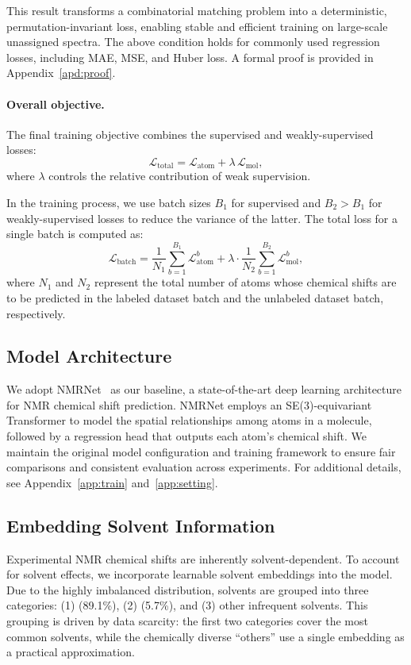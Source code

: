 This result transforms a combinatorial matching problem into a deterministic, permutation-invariant loss, enabling stable and efficient training on large-scale unassigned spectra.
The above condition holds for commonly used regression losses, including MAE, MSE, and Huber loss.
A formal proof is provided in Appendix~\ref{apd:proof}.

\paragraph{Overall objective.}
The final training objective combines the supervised and weakly-supervised losses:
\begin{equation}
\mathcal{L}_{\text{total}} = \mathcal{L}_{\text{atom}} + \lambda \, \mathcal{L}_{\text{mol}},
\label{eq:loss-total}
\end{equation}
where $\lambda$ controls the relative contribution of weak supervision.

In the training process, we use batch sizes $B_1$ for supervised and $B_2 > B_1$ for weakly-supervised losses to reduce the variance of the latter.
The total loss for a single batch is computed as:
\begin{equation}
\mathcal{L}_{\text{batch}} = \frac{1}{N_1} \sum_{b=1}^{B_1} \mathcal{L}_{\text{atom}}^b + \lambda \cdot \frac{1}{N_2} \sum_{b=1}^{B_2} \mathcal{L}_{\text{mol}}^b,
\end{equation}
where \( N_1 \) and \( N_2 \) represent the total number of atoms whose chemical shifts are to be predicted in the labeled dataset batch and the unlabeled dataset batch, respectively.


\subsection{Model Architecture}

We adopt NMRNet~\cite{xu2025toward} as our baseline, a state-of-the-art deep learning architecture for NMR chemical shift prediction. NMRNet employs an SE(3)-equivariant Transformer to model the spatial relationships among atoms in a molecule, followed by a regression head that outputs each atom's chemical shift. We maintain the original model configuration and training framework to ensure fair comparisons and consistent evaluation across experiments. For additional details, see Appendix~\ref{app:train} and~\ref{app:setting}.





\subsection{Embedding Solvent Information}
\label{subsec:solv_embed}
Experimental NMR chemical shifts are inherently solvent-dependent. To account for solvent effects, we incorporate learnable solvent embeddings into the model.
Due to the highly imbalanced distribution, solvents are grouped into three categories: (1)  (89.1\%), (2)  (5.7\%), and (3) other infrequent solvents.
This grouping is driven by data scarcity: the first two categories cover the most common solvents, while the chemically diverse “others” use a single embedding as a practical approximation.

